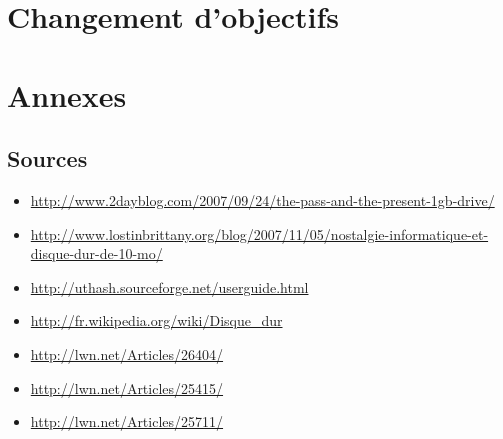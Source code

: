 \documentclass[a4paper,10pt]{article}
\begin{document}
\section{Changement d'objectifs}

\newpage
\section{Annexes}
\subsection{Sources}
\begin{itemize} 
 \item \url{http://www.2dayblog.com/2007/09/24/the-pass-and-the-present-1gb-drive/}
 \item \url{http://www.lostinbrittany.org/blog/2007/11/05/nostalgie-informatique-et-disque-dur-de-10-mo/}
 \item \url{http://uthash.sourceforge.net/userguide.html}
 \item \url{http://fr.wikipedia.org/wiki/Disque\_dur}
 \item \url{http://lwn.net/Articles/26404/}
 \item \url{http://lwn.net/Articles/25415/}
 \item \url{http://lwn.net/Articles/25711/}
\end{itemize}
\end{document}
